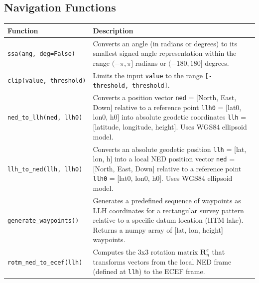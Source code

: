 \documentclass[
  letterpaper,
  DIV=11,
  numbers=noendperiod]{scrreprt}
\begin{document}
\subsection*{Navigation Functions}\label{navigation-functions}

\begin{longtable}[]{@{}
  >{\raggedright\arraybackslash}p{}
  >{\raggedright\arraybackslash}p{}@{}}
\toprule\noalign{}
\begin{minipage}[b]{\linewidth}\raggedright
Function
\end{minipage} & \begin{minipage}[b]{\linewidth}\raggedright
Description
\end{minipage} \\
\midrule\noalign{}
\endhead
\bottomrule\noalign{}
\endlastfoot
\texttt{ssa(ang,\ deg=False)} & Converts an angle (in radians or
degrees) to its smallest signed angle representation within the range
\((-\pi, \pi]\) radians or \((-180, 180]\) degrees. \\
\texttt{clip(value,\ threshold)} & Limits the input \texttt{value} to
the range \texttt{{[}-threshold,\ threshold{]}}. \\
\texttt{ned\_to\_llh(ned,\ llh0)} & Converts a position vector
\texttt{ned} = {[}North, East, Down{]} relative to a reference point
\texttt{llh0} = {[}lat0, lon0, h0{]} into absolute geodetic coordinates
\texttt{llh} = {[}latitude, longitude, height{]}. Uses WGS84 ellipsoid
model. \\
\texttt{llh\_to\_ned(llh,\ llh0)} & Converts an absolute geodetic
position \texttt{llh} = {[}lat, lon, h{]} into a local NED position
vector \texttt{ned} = {[}North, East, Down{]} relative to a reference
point \texttt{llh0} = {[}lat0, lon0, h0{]}. Uses WGS84 ellipsoid
model. \\
\texttt{generate\_waypoints()} & Generates a predefined sequence of
waypoints as LLH coordinates for a rectangular survey pattern relative
to a specific datum location (IITM lake). Returns a numpy array of
{[}lat, lon, height{]} waypoints. \\
\texttt{rotm\_ned\_to\_ecef(llh)} & Computes the 3x3 rotation matrix
\(\mathbf{R}_n^e\) that transforms vectors from the local NED frame
(defined at \texttt{llh}) to the ECEF frame. \\
\end{longtable}
\end{document}
